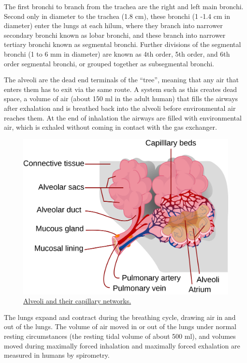 The first bronchi to branch from the trachea are the right and left main bronchi. Second only in diameter to the trachea (1.8 cm), these bronchi (1 -1.4 cm in diameter) enter the lungs at each hilum, where they branch into narrower secondary bronchi known as lobar bronchi, and these branch into narrower tertiary bronchi known as segmental bronchi. Further divisions of the segmental bronchi (1 to 6 mm in diameter) are known as 4th order, 5th order, and 6th order segmental bronchi, or grouped together as subsegmental bronchi.

The alveoli are the dead end terminals of the ``tree'', meaning that any air that enters them has to exit via the same route. A system such as this creates dead space, a volume of air (about 150 ml in the adult human) that fills the airways after exhalation and is breathed back into the alveoli before environmental air reaches them. At the end of inhalation the airways are filled with environmental air, which is exhaled without coming in contact with the gas exchanger.



\begin{figure}

{\centering \includegraphics[width=0.7\linewidth]{./figures/respiratory/Alveolus diagram en} 

}

\caption{\href{https://upload.wikimedia.org/wikipedia/commons/4/46/Alveolus_diagram.svg}{Alveoli and their capillary networks.}}\label{fig:alveolusdiagram}
\end{figure}

The lungs expand and contract during the breathing cycle, drawing air in and out of the lungs. The volume of air moved in or out of the lungs under normal resting circumstances (the resting tidal volume of about 500 ml), and volumes moved during maximally forced inhalation and maximally forced exhalation are measured in humans by spirometry.



